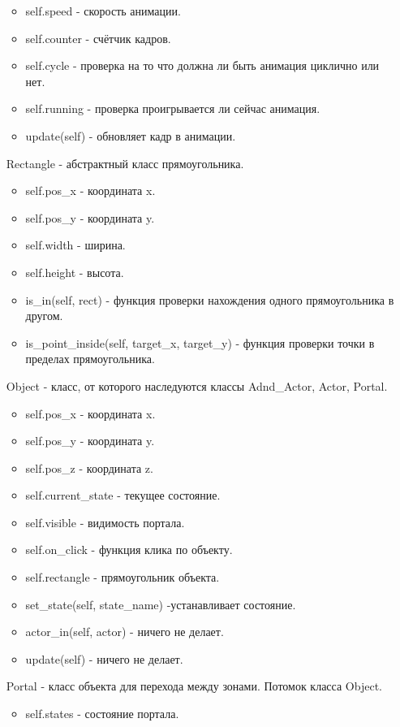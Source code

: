 \begin{enumerate}
\begin{itemize}
		\item self.speed - скорость анимации.
		\item self.counter - счётчик кадров.
		\item self.cycle - проверка на то что должна ли быть анимация циклично или нет.
		\item self.running - проверка проигрывается ли сейчас анимация.
		\item update(self) - обновляет кадр в анимации.
	\end{itemize}
	\item[Rectangle] - абстрактный класс прямоугольника.
	\begin{itemize}
		\item self.pos\_x - координата x.
		\item self.pos\_y - координата y.
		\item self.width - ширина.
		\item self.height - высота.
		\item is\_in(self, rect) - функция проверки нахождения одного прямоугольника в другом.
		\item is\_point\_inside(self, target\_x, target\_y) - функция проверки точки в пределах прямоугольника.
	\end{itemize}
	\item[Object] - класс, от которого наследуются классы Adnd\_Actor, Actor, Portal.
	\begin{itemize}
		\item self.pos\_x - координата x.
		\item self.pos\_y - координата y.
		\item self.pos\_z - координата z.
		\item self.current\_state - текущее состояние.
		\item self.visible - видимость портала.
		\item self.on\_click - функция клика по объекту.
		\item self.rectangle - прямоугольник объекта.
		\item set\_state(self, state\_name) -устанавливает состояние.
		\item actor\_in(self, actor) - ничего не делает.
		\item update(self) - ничего не делает.
	\end{itemize}
	\item[Portal] - класс объекта для перехода между зонами. Потомок класса Object.
	\begin{itemize}
		\item self.states - состояние портала.

\end{itemize}
\end{enumerate}
